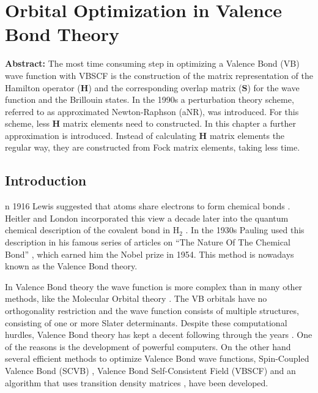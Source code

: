 \chapter{Orbital Optimization in Valence Bond Theory}
\label{chap_orbopt}


\noindent\textbf{Abstract:} The most time consuming step in optimizing a Valence Bond (VB) wave function with VBSCF is the construction of the matrix representation of the Hamilton operator ($\mathbf{H}$) and the corresponding overlap matrix ($\mathbf{S}$) for the wave function and the Brillouin states. In the 1990s a perturbation theory scheme, referred to as approximated Newton-Raphson (aNR), was introduced. For this scheme, less $\mathbf{H}$ matrix elements need to constructed. In this chapter a further approximation is introduced. Instead of calculating $\mathbf{H}$ matrix elements the regular way, they are constructed from Fock matrix elements, taking less time.

\newpage

\section{Introduction}

\lettrine{}{}n 1916 Lewis suggested that atoms share electrons to form chemical bonds \cite{lewis}. Heitler and London incorporated this view a decade later into the quantum chemical description of the covalent bond in H$_2$ \cite{heitler}. In the 1930s Pauling used this description in his famous series of articles on ``The Nature Of The Chemical Bond'' \cite{pauling1,pauling2,pauling3,pauling4,pauling5,pauling6,pauling7,paulingbook}, which earned him the Nobel prize in 1954. This method is nowadays known as the Valence Bond theory.

In Valence Bond theory the wave function is more complex than in many other methods, like the Molecular Orbital theory \cite{hartree1,hartree2,hartree3,fock}. The VB orbitals have no orthogonality restriction and the wave function consists of multiple structures, consisting of one or more Slater determinants. Despite these computational hurdles, Valence Bond theory has kept a decent following through the years \cite{vboverv1,vboverv2,vboverv3}. One of the reasons is the development of powerful computers. On the other hand several efficient methods to optimize Valence Bond wave functions, Spin-Coupled Valence Bond (SCVB) \cite{scvb1,scvb2,scvb3}, Valence Bond Self-Consistent Field (VBSCF) \cite{vbscf1,vbscf2,koos1,zahid} and an algorithm that uses transition density matrices \cite{song}, have been developed.

